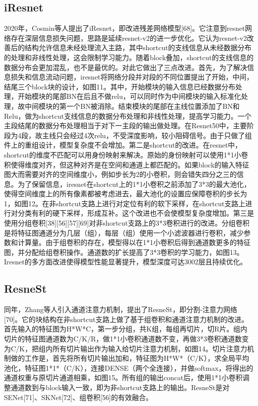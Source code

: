 \documentclass[15pt]{article}
\begin{document}
\subsection{iResnet}
2020年，Cosmin等人提出了iResnet，即改进残差网络模型[68]。它注意到resnet网络存在深层信息损失问题，思路是延续resnet-v2的进一步优化。它认为resnet-v2改善后的结构允许信息未经处理流入主路，其中shortcut的支线信息从未经数据分布的处理和非线性处理，这会限制学习能力。随着block叠加，shortcut的支线信息的数据分布会更加混乱，也不是最优的。对此它做出了三点改进。首先，为了解决信息损失和信息流动问题，iresnet将网络分段并对段的不同位置提出了开始，中间，结尾三个block块的设计，如图11。其中，开始模块的输入信息已经数据分布处理，开始模块的尾部BN在后且不做relu，可以同时作为中间模块的输入标准化处理，故中间模块的第一个BN被消除。结束模块的尾部在主线位置添加了BN和Relu，做为shortcut支线信息的数据分布处理和非线性处理，提高学习能力。一个主段结尾的数据分布处理相当于对下一主段的输出做处理。在Resnet50中，主要阶段为4段，故主线只会经过4次relu，不受深度影响，较小阻碍信号。由于只做了组件上的重组设计，模型复杂度不会增加。第二是shortcut的改进。在resnet中，shortcut的维度不匹配可以用身份映射来解决。原始的身份映射可以使用1*1小卷积使得维度对齐，但这种对齐是在空间和通道上都匹配的。如果block的输入特征图大而需要对齐的空间维度小，例如步长为2的小卷积，则会错失四分之三的信息。为了保留信息，iresnet在shortcut上的1*1小卷积之前添加了3*3的最大池化，使得空间维度上的所有像素都被考虑进去，最大池化的设置应保障卷积的步长为1，如图12。在非shortcut支路上进行对定位有利的软下采样，在shortcut支路上进行对分类有利的硬下采样，形成互补。这个改进也不会使模型复杂度增加。第三是使用分组卷积[38][56][57][69]对非shortcut支路上的3*3卷积进行的改进。分组卷积是将特征图通道分为几层（组），每层（组）使用一个小滤波器进行卷积，减少参数和计算量。由于组卷积的存在，模型得以在1*1小卷积后得到通道数更多的特征图，并分配给组卷积操作。通道数的扩长提高了3*3卷积的学习能力，如图13。Iresnet的多方面改进使得模型性能显著提升，模型深度可达3002层且持续优化。

\subsection{ResneSt}
同年，Zhang等人引入通道注意力机制，提出了ResneSt，即分割-注意力网络[70]。它的块结构在非shortcut支路上做了基于组卷积和通道注意力机制的改进。首先输入的特征图为H*W*C，第一步分组，共K组，每组再切片，切R片。组内切片的特征图通道数为C/K/R，做1*1小卷积通道数不变，再做3*3卷积通道数变为C/K，把组内所有切片输出作为输入给切片注意力机制，如图14。切片注意力机制做的工作是，首先将所有切片输出加和，特征图为H*W*（C/K），求全局平均池化，特征图1*1*（C/K），连接DENSE（两个全连接），并做softmax，将得出的通道权重与原切片通道相乘，如图15。所有组的输出concat后，使用1*1小卷积调整通道数到与block输入一致，即为非shortcut支路上的输出。ResneSt是对SENet[71]、SKNet[72]、组卷积[56]的有效融合。
\end{document}
